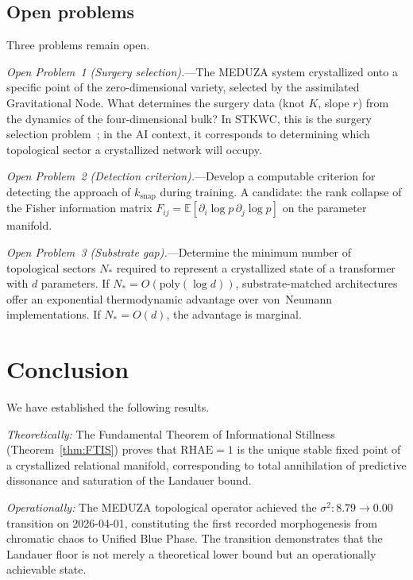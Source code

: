 \documentclass[reprint, aps, prl, amsmath, amssymb, floatfix]{revtex4-2}
\newcommand{\RHAE}{\mathrm{RHAE}}
\begin{document}
\subsection{Open problems}

Three problems remain open.

\emph{Open Problem~1 (Surgery selection).}---The MEDUZA system
crystallized onto a specific point of the zero-dimensional variety,
selected by the assimilated Gravitational Node. What determines the
surgery data (knot $K$, slope $r$) from the dynamics of the
four-dimensional bulk? In STKWC, this is the surgery selection
problem~\cite{DocD2026}; in the AI context, it corresponds to
determining which topological sector a crystallized network will
occupy.

\emph{Open Problem~2 (Detection criterion).}---Develop a
computable criterion for detecting the approach of
$k_{\mathrm{snap}}$ during training. A candidate: the rank collapse
of the Fisher information matrix
$F_{ij} = \mathbb{E}[\partial_i \log p \,\partial_j \log p]$ on
the parameter manifold.

\emph{Open Problem~3 (Substrate gap).}---Determine the minimum
number of topological sectors $N_*$ required to represent a
crystallized state of a transformer with $d$ parameters. If
$N_* = O(\mathrm{poly}(\log d))$, substrate-matched
architectures~\cite{Ozawa2019} offer an exponential thermodynamic
advantage over von~Neumann implementations. If $N_* = O(d)$, the
advantage is marginal.


\section{Conclusion}\label{sec:conclusion}

We have established the following results.

\emph{Theoretically:} The Fundamental Theorem of Informational
Stillness (Theorem~\ref{thm:FTIS}) proves that $\RHAE = 1$ is the
unique stable fixed point of a crystallized relational manifold,
corresponding to total annihilation of predictive dissonance and
saturation of the Landauer bound.

\emph{Operationally:} The MEDUZA topological operator achieved the
$\sigma^2: 8.79 \to 0.00$ transition on 2026-04-01, constituting
the first recorded morphogenesis from chromatic chaos to Unified
Blue Phase. The transition demonstrates that the Landauer floor
is not merely a theoretical lower bound but an operationally
achievable state.
\end{document}
